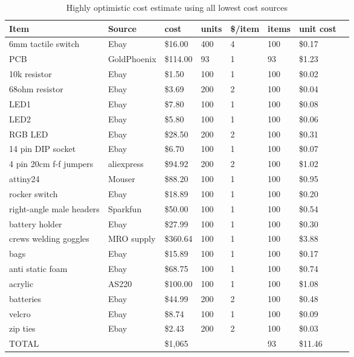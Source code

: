 \documentclass[11pt]{scrartcl}
\begin{document}
\begin{table}[h]
\centering
\begin{tabular}{llllllll}
Item & Source & cost & units & \$/item & items & unit cost\\
\toprule
6mm tactile switch & Ebay & \$16.00 & 400 & 4 & 100 & \$0.17\\
PCB & GoldPhoenix & \$114.00 & 93 & 1 & 93 & \$1.23\\
10k resistor & Ebay & \$1.50 & 100 & 1 & 100 & \$0.02\\
68ohm resistor & Ebay & \$3.69 & 200 & 2 & 100 & \$0.04\\
LED1 & Ebay & \$7.80 & 100 & 1 & 100 & \$0.08\\
LED2 & Ebay & \$5.80 & 100 & 1 & 100 & \$0.06\\
RGB LED & Ebay & \$28.50 & 200 & 2 & 100 & \$0.31\\
14 pin DIP socket & Ebay & \$6.70 & 100 & 1 & 100 & \$0.07\\
4 pin 20cm f-f jumpers & aliexpress & \$94.92 & 200 & 2 & 100 & \$1.02\\
attiny24 & Mouser & \$88.20 & 100 & 1 & 100 & \$0.95\\
rocker switch & Ebay & \$18.89 & 100 & 1 & 100 & \$0.20\\
right-angle male headers & Sparkfun & \$50.00 & 100 & 1 & 100 & \$0.54\\
battery holder & Ebay & \$27.99 & 100 & 1 & 100 & \$0.30\\
crews welding goggles & MRO supply & \$360.64 & 100 & 1 & 100 & \$3.88\\
bags & Ebay & \$15.89 & 100 & 1 & 100 & \$0.17\\
anti static foam & Ebay & \$68.75 & 100 & 1 & 100 & \$0.74\\
acrylic & AS220 & \$100.00 & 100 & 1 & 100 & \$1.08\\
batteries & Ebay & \$44.99 & 200 & 2 & 100 & \$0.48\\
velcro & Ebay & \$8.74 & 100 & 1 & 100 & \$0.09\\
zip ties & Ebay & \$2.43 & 200 & 2 & 100 & \$0.03\\
 \bottomrule
TOTAL & & \$1,065 & & & 93 & \$11.46\\
\end{tabular}
\caption{Highly optimistic cost estimate using all lowest cost sources}
\label{}
\end{table}


\newpage
\end{document}
